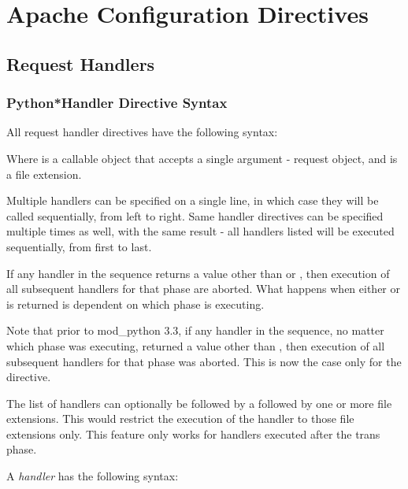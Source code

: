 \chapter{Apache Configuration Directives\label{directives}}

\section{Request Handlers\label{dir-handlers}}

\subsection{Python*Handler Directive Syntax\label{dir-handlers-syn}}

All request handler directives have the following syntax: 


Where  is a callable object that accepts a single
argument - request object, and  is a file extension.

Multiple handlers can be specified on a single line, in which case
they will be called sequentially, from left to right. Same handler
directives can be specified multiple times as well, with the same
result - all handlers listed will be executed sequentially, from first
to last.

If any handler in the sequence returns a value other than 
or , then execution of all subsequent handlers for
that phase are aborted. What happens when either  or
 is returned is dependent on which phase is
executing.

Note that prior to mod_python 3.3, if any handler in the sequence, no
matter which phase was executing, returned a value other than
, then execution of all subsequent handlers for that phase
was aborted. This is now the case only for the 
directive.

The list of handlers can optionally be followed by a \code{|} followed
by one or more file extensions. This would restrict the execution of
the handler to those file extensions only. This feature only works for
handlers executed after the trans phase.

A \emph{handler} has the following syntax: 


